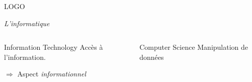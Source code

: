 \begin{frame}{LOGO}
\end{frame}

\begin{frame}
  \begin{center}
    \vspace{.4cm}
    \emph{\huge L'informatique}
    \vspace{-.4cm}
  \end{center}
  \begin{columns}[T]
    \begin{column}[l]{.5\textwidth}
      \begin{block}{\og Information Technology \fg{}}
        Accès à l'information.
        
        $\Rightarrow$ Aspect \emph{informationnel}
      \end{block}
    \end{column}
    \begin{column}[l]{.5\textwidth}
      \begin{block}{\og Computer Science\fg{}}
        Manipulation de données
        

\end{block}
\end{column}
\end{columns}
\end{frame}

